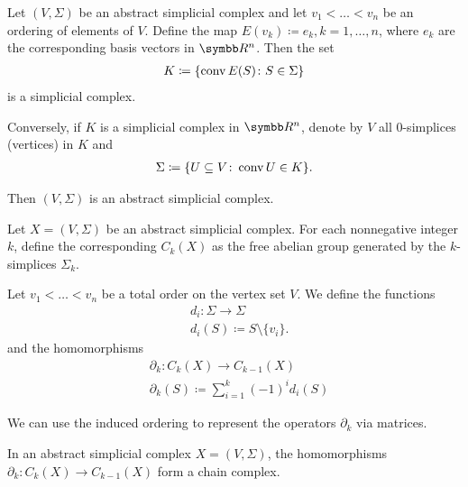 \begin{proposition}\label{thm:abstract_simplicial_complex_iff_simplicial_complex}
  Let \( (V, \Sigma) \) be an abstract simplicial complex and let \( v_1 < \ldots < v_n \) be an ordering of elements of \( V \). Define the map \( E(v_k) \coloneqq e_k, k = 1, \ldots, n \), where \( e_k \) are the corresponding basis vectors in \( \BB{R^n} \). Then the set
  \begin{align*}
    K \coloneqq \{ \operatorname{conv} E(S) \colon S \in \Sigma \}
  \end{align*}
  is a simplicial complex.

  Conversely, if \( K \) is a simplicial complex in \( \BB{R^n} \), denote by \( V \) all \( 0 \)-simplices (vertices) in \( K \) and
  \begin{align*}
    \Sigma \coloneqq \{ U \subseteq V \colon \operatorname{conv} U \in K \}.
  \end{align*}

  Then \( (V, \Sigma) \) is an abstract simplicial complex.
\end{proposition}

\begin{definition}\label{def:group_of_chains}\cite[262]{Carlsson2009}
  Let \( X = (V, \Sigma) \) be an abstract simplicial complex. For each nonnegative integer \( k \), define the corresponding  \( C_k(X) \) as the free abelian group generated by the \( k \)-simplices \( \Sigma_k \).

  Let \( v_1 < \ldots < v_n \) be a total order on the vertex set \( V \). We define the functions
  \begin{align*}
    &d_i: \Sigma \to \Sigma \\
    &d_i(S) \coloneqq S \setminus \{ v_i \}.
  \end{align*}
  and the homomorphisms
  \begin{align*}
    &\partial_k: C_k(X) \to C_{k-1}(X) \\
    &\partial_k(S) \coloneqq \sum_{i=1}^k (-1)^i d_i(S)
  \end{align*}

  We can use the induced ordering to represent the operators \( \partial_k \) via matrices.
\end{definition}

\begin{proposition}\label{def:abstract_simplicial_chain_complex}
  In an abstract simplicial complex \( X = (V, \Sigma) \), the homomorphisms \( \partial_k: C_k(X) \to C_{k-1}(X) \) form a chain complex.
\end{proposition}
